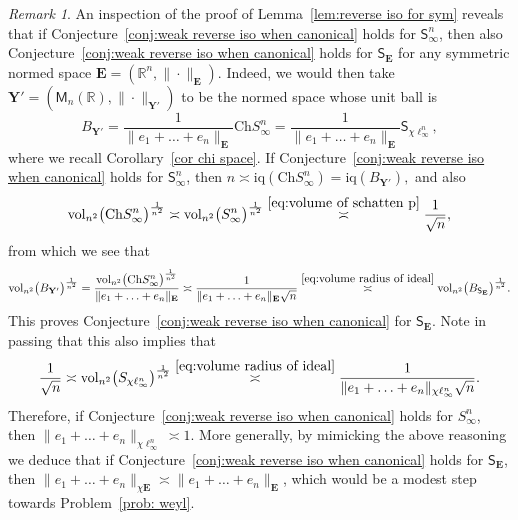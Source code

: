 \documentclass[11pt,reqno]{amsart}
\newcommand{\Y}{\mathbf Y}
\newcommand{\R}{\mathbb R}
\theoremstyle{remark}
\newtheorem{remark}[theorem]{Remark}
\newcommand{\iq}{\mathrm{iq}}
\newcommand{\M}{\mathsf{M}}
\newcommand{\sfS}{\mathsf{S}}
\newcommand{\Ch}{\mathrm{Ch}}
\newcommand{\vol}{\mathrm{vol}}
\renewcommand{\1}{\mathbf 1}
\newcommand{\bfE}{\mathbf{E}}
\begin{document}
\begin{remark}\label{rem:schatten infty implies SE} An inspection of the proof of Lemma~\ref{lem:reverse iso for sym}  reveals that if Conjecture~\ref{conj:weak reverse iso when canonical} holds for $\sfS_\infty^n$, then also Conjecture~\ref{conj:weak reverse iso when canonical}  holds for $\sfS_\bfE$ for any symmetric normed space $\bfE=(\R^n,\|\cdot\|_\bfE)$. Indeed, we would then take $\Y'=(\M_n(\R),\|\cdot\|_{\Y'})$ to be the normed space whose unit ball is
$$
B_{\Y'}=\frac{1}{\|e_1+\ldots+e_n\|_\bfE}\Ch S_\infty^n= \frac{1}{\|e_1+\ldots+e_n\|_\bfE}\sfS_{\chi\ell_\infty^n},
$$
where we recall Corollary~\ref{cor chi space}. If Conjecture~\ref{conj:weak reverse iso when canonical} holds for $\sfS_\infty^n$, then
$
n\asymp \iq(\Ch S_\infty^n)=\iq(B_{\Y'}),
$
and also
$$
\vol_{n^2}\big(\Ch S_\infty^n\big)^{\frac{1}{n^2}}\asymp \vol_{n^2}\big(S_\infty^n\big)^{\frac{1}{n^2}}\stackrel{\eqref{eq:volume of schatten p}}{\asymp} \frac{1}{\sqrt{n}},
$$
from which we see that
$$
\vol_{n^2}\big(B_{\Y'}\big)^{\frac{1}{n^2}}=\frac{\vol_{n^2}\big(\Ch S_\infty^n\big)^{\frac{1}{n^2}}}{\|e_1+\ldots+e_n\|_\bfE}\asymp \frac{1}{\|e_1+\ldots+e_n\|_\bfE\sqrt{n}}\stackrel{\eqref{eq:volume radius of ideal}}{\asymp}
\vol_{n^2}\big(B_{\sfS_\bfE}\big)^{\frac{1}{n^2}}.
$$
This proves Conjecture~\ref{conj:weak reverse iso when canonical} for $\sfS_\bfE$. Note in passing that this also implies that
$$
\frac{1}{\sqrt{n}}\asymp \vol_{n^2}\big(S_{\chi\ell_\infty^n}\big)^{\frac{1}{n^2}}\stackrel{\eqref{eq:volume radius of ideal}}{\asymp}
\frac{1}{\|e_1+\ldots+e_n\|_{\chi\ell_\infty^n}\sqrt{n}}.
$$
Therefore,  if Conjecture~\ref{conj:weak reverse iso when canonical} holds for $S_\infty^n$, then $\|e_1+\ldots+e_n\|_{\chi\ell_\infty^n}\asymp 1$. More generally, by mimicking the above reasoning we deduce that if Conjecture~\ref{conj:weak reverse iso when canonical} holds for $\sfS_\bfE$, then  $\|e_1+\ldots+e_n\|_{\chi\bfE}\asymp \|e_1+\ldots+e_n\|_{\bfE}$, which would be a modest step towards Problem~\ref{prob: weyl}.
\end{remark}
\end{document}
